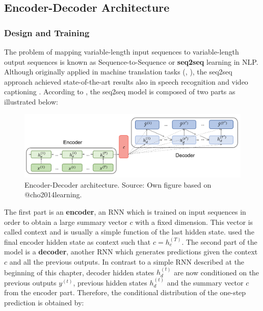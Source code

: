\documentclass[]{krantz}
\begin{document}
\hypertarget{encoder-decoder-architecture}{%
\subsection{Encoder-Decoder Architecture}\label{encoder-decoder-architecture}}

\hypertarget{design-and-training}{%
\subsubsection{Design and Training}\label{design-and-training}}

The problem of mapping variable-length input sequences to variable-length output sequences is known as Sequence-to-Sequence or \textbf{seq2seq} learning in NLP. Although originally applied in machine translation tasks (\citet{sutskever2014sequence}, \citet{cho2014learning}), the seq2seq approach achieved state-of-the-art results also in speech recognition \citep{prabhavalkar2017comparison} and video captioning \citep{venugopalan2015sequence}. According to \citet{cho2014learning}, the seq2seq model is composed of two parts as illustrated below:

\begin{figure}

{\centering \includegraphics[width=1\linewidth]{figures/01-02-rnns-and-their-applications-in-nlp/3_encoder_decoder} 

}

\caption{Encoder-Decoder architecture. Source: Own figure based on @cho2014learning.}\label{fig:01-02-enc-dec}
\end{figure}

The first part is an \textbf{encoder}, an RNN which is trained on input sequences in order to obtain a large summary vector \(c\) with a fixed dimension. This vector is called context and is usually a simple function of the last hidden state. \citet{sutskever2014sequence} used the final encoder hidden state as context such that \(c=h_{e}^{(T)}\). The second part of the model is a \textbf{decoder}, another RNN which generates predictions given the context \(c\) and all the previous outputs. In contrast to a simple RNN described at the beginning of this chapter, decoder hidden states \(h_{d}^{(t)}\) are now conditioned on the previous outputs \(y^{(t)}\), previous hidden states \(h_{d}^{(t)}\) and the summary vector \(c\) from the encoder part. Therefore, the conditional distribution of the one-step prediction is obtained by:
\end{document}
